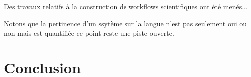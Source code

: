 \documentclass[]{easychair}
\begin{document}
Des travaux relatifs à la construction de workflows scientifiques ont été menés...

Notons que la pertinence d'un ssytème sur la langue n'est pas seulement oui ou non mais est quantifiée ce point reste une piste ouverte.


\section{Conclusion}
\label{sect:conclusion}



%
\label{sect:bib}

%
%
%


\appendix


\end{document}
